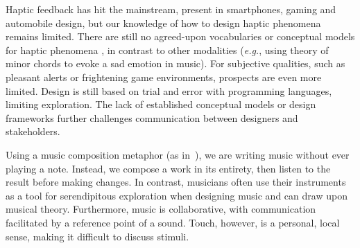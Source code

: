 Haptic feedback has hit %
the mainstream, present in smartphones, gaming and automobile design,
but our knowledge of how to design haptic phenomena remains limited.
There are still no agreed-upon vocabularies or conceptual models for haptic phenomena \cite{Enriquez2003,Ledo2012,Lee2009,Obrist2013}, %
in contrast to other modalities (\emph{e.g.}, using theory of minor chords to evoke a sad emotion in music).
For subjective qualities, such as pleasant alerts or frightening game environments, prospects are even more limited.
%
Design is still based on trial and error with programming languages, limiting exploration.
The lack of established conceptual models or design frameworks further challenges communication between designers and stakeholders.




Using a music composition metaphor (as in~\cite{Lee2009}), we are writing music without ever playing a note.
Instead, we compose a work in its entirety, then listen to the result before making changes.
In contrast, musicians often use their instruments as a tool for serendipitous exploration when designing music
and can draw upon musical theory.
Furthermore, music is collaborative, with communication facilitated by a reference point of a sound.
Touch, however, is a personal, local sense, making it difficult to discuss stimuli.

